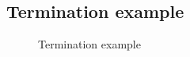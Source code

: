 \subsection{Termination example}

\begin{figure}
    \centering
    
    \caption{Termination example}
    \label{fig:termination-example}
\end{figure}
